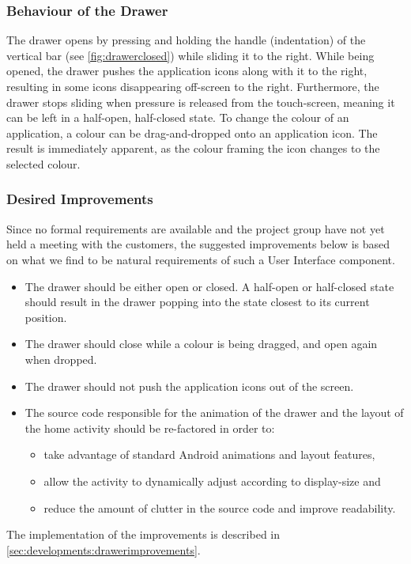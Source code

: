 \subsubsection{Behaviour of the Drawer}\label{sec:drawer:behaviour}
The drawer opens by pressing and holding the handle (indentation) of the vertical bar (see \cref{fig:drawerclosed}) while sliding it to the right.
While being opened, the drawer pushes the application icons along with it to the right, resulting in some icons disappearing off-screen to the right.
Furthermore, the drawer stops sliding when pressure is released from the touch-screen, meaning it can be left in a half-open, half-closed state.
To change the colour of an application, a colour can be drag-and-dropped onto an application icon. 
The result is immediately apparent, as the colour framing the icon changes to the selected colour.

\subsubsection{Desired Improvements}
Since no formal requirements are available and the project group have not yet held a meeting with the customers, the suggested improvements below is based on what we find to be natural requirements of such a User Interface component. 

\begin{itemize}
\item The drawer should be either open or closed. A half-open or half-closed state should result in the drawer popping into the state closest to its current position.
\item The drawer should close while a colour is being dragged, and open again when dropped.
\item The drawer should not push the application icons out of the screen.
\item The source code responsible for the animation of the drawer and the layout of the home activity should be re-factored in order to:
\begin{itemize}
\item take advantage of standard Android animations and layout features,
\item allow the activity to dynamically adjust according to display-size and
\item reduce the amount of clutter in the source code and improve readability.
\end{itemize}
\end{itemize}

The implementation of the improvements is described in \cref{sec:developments:drawerimprovements}.